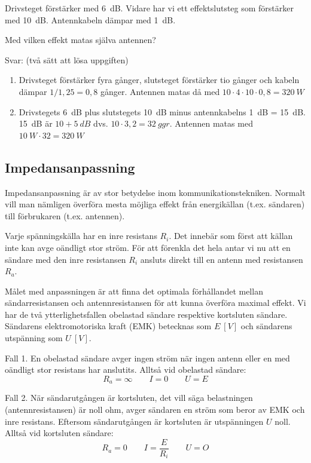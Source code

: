 Drivsteget förstärker med \SI{6}{dB}. Vidare har vi ett effektslutsteg som 
förstärker med \SI{10}{dB}. Antennkabeln dämpar med \SI{1}{dB}.

Med vilken effekt matas själva antennen?

Svar: (två sätt att lösa uppgiften)

\begin{enumerate}
\item Drivsteget förstärker fyra gånger, slutsteget förstärker tio gånger och
kabeln dämpar \(1/1,25 = 0,8\) gånger. Antennen matas då med
\(10 \cdot 4 \cdot 10 \cdot 0,8 = \SI{320}{W}\)

\item Drivstegets 6~dB plus slutstegets 10~dB minus antennkabelns 1~dB = 15~dB.
15~dB är \(10 + \SI{5}{dB}\) dvs. \(10 \cdot 3,2 = \SI{32}{ggr}\). Antennen 
matas med \(\SI{10}{W} \cdot 32 = \SI{320}{W}\)
\end{enumerate}

\subsection{Impedansanpassning}

Impedansanpassning är av stor betydelse inom kommunikationstekniken.
Normalt vill man nämligen överföra mesta möjliga effekt från energikällan
(t.ex. sändaren) till förbrukaren (t.ex. antennen).

Varje spänningskälla har en inre resistans \(R_i\). Det innebär som först att
källan inte kan avge oändligt stor ström.
För att förenkla det hela antar vi nu att en sändare med den inre resistansen
\(R_i\) ansluts direkt till en antenn med resistansen \(R_a\).

Målet med anpassningen är att finna det optimala förhållandet mellan
sändarresistansen och antennresistansen för att kunna överföra maximal effekt.
Vi har de två ytterlighetsfallen obelastad sändare respektive kortsluten
sändare. Sändarens elektromotoriska kraft (EMK) betecknas som \(E\ [\unit{V}]\) 
och sändarens utspänning som \(U\ [\unit{V}]\).

Fall 1.
En obelastad sändare avger ingen ström när ingen antenn eller en med oändligt
stor resistans har anslutits.
Alltså vid obelastad sändare:
\[   	R_a = \infty \qquad I = 0 \qquad U = E   \]

Fall 2.
När sändarutgången är kortsluten, det vill säga belastningen
(antennresistansen) är noll ohm, avger sändaren en ström som beror av EMK och
inre resistans.
Eftersom sändarutgången är kortsluten är utspänningen \(U\) noll.
Alltså vid kortsluten sändare:
\[   R_a = 0 \qquad I = \dfrac{E}{R_i} \qquad U = O	\]

